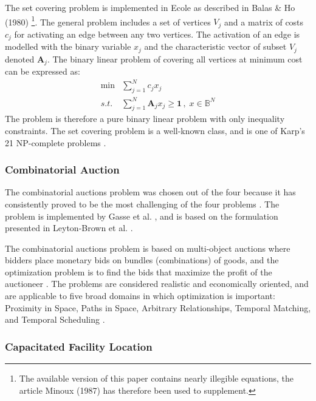 The set covering problem is implemented in \gls{Ecole} as described in Balas \& Ho (1980)\cite{balas1980set} \footnote{The available version of this paper contains nearly illegible equations, the article Minoux (1987) \cite{minoux1987class} has therefore been used to supplement.}. The general problem includes a set of vertices $V_j$ and a matrix of costs $c_j$ for activating an edge between any two vertices. The activation of an edge is modelled with the binary variable $x_j$ and the characteristic vector of subset $V_j$ denoted $\textbf{A}_j$. The binary linear problem of covering all vertices at minimum cost can be expressed as: 
\begin{align}
    \min &\sum_{j=1}^N c_j x_j \\ s.t. \; &\sum_{j=1}^N \mathbf{A}_j x_j \geq \mathbf{1} \,,\; x \in \mathbb{B}^N 
\end{align}
The problem is therefore a pure binary linear problem with only inequality constraints. The set covering problem is a well-known class, and is one of Karp's 21 \gls{NP}-complete problems \cite{karp1972reducibility}.  

\subsubsection{Combinatorial Auction}

The combinatorial auctions problem was chosen out of the four because it has consistently proved to be the most challenging of the four problems \cite{gasse2019exact} \cite{gupta2020hybrid}. The problem is implemented by Gasse et al. \cite{gasse2019exact}, and is based on the formulation presented in Leyton-Brown et al. \cite{brown2000towards}.  

The combinatorial auctions problem is based on multi-object auctions where bidders place monetary bids on bundles (combinations) of goods, and the optimization problem is to find the bids that maximize the profit of the auctioneer \cite{brown2000towards}. The problems are considered realistic and economically oriented, and are applicable to five broad domains in which optimization is important: Proximity in Space, Paths in Space, Arbitrary Relationships, Temporal Matching, and Temporal Scheduling \cite{brown2000towards}.  


\subsubsection{Capacitated Facility Location}


